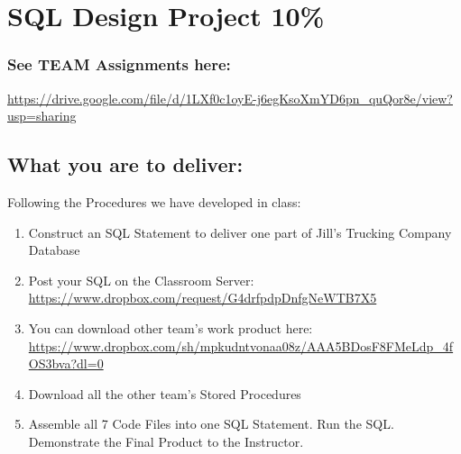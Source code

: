 
\section{SQL Design Project 10\%}

\subsubsection{See TEAM Assignments here:}
\url{https://drive.google.com/file/d/1LXf0c1oyE-j6egKsoXmYD6pn_quQor8e/view?usp=sharing}

\subsection{What you are to deliver:}

Following the Procedures we have developed in class:
\begin{enumerate}
    \item Construct an SQL Statement to deliver one part of Jill's Trucking Company Database
    \item Post your SQL on the Classroom Server: 
    \url{https://www.dropbox.com/request/G4drfpdpDnfgNeWTB7X5}
    \item You can download other team's work product here: 
    \url{https://www.dropbox.com/sh/mpkudntvonaa08z/AAA5BDosF8FMeLdp_4fOS3bva?dl=0}
    \item Download all the other team's Stored Procedures
    \item Assemble all 7 Code Files into one SQL Statement. Run the SQL. Demonstrate the Final Product to the Instructor.
\end{enumerate}

